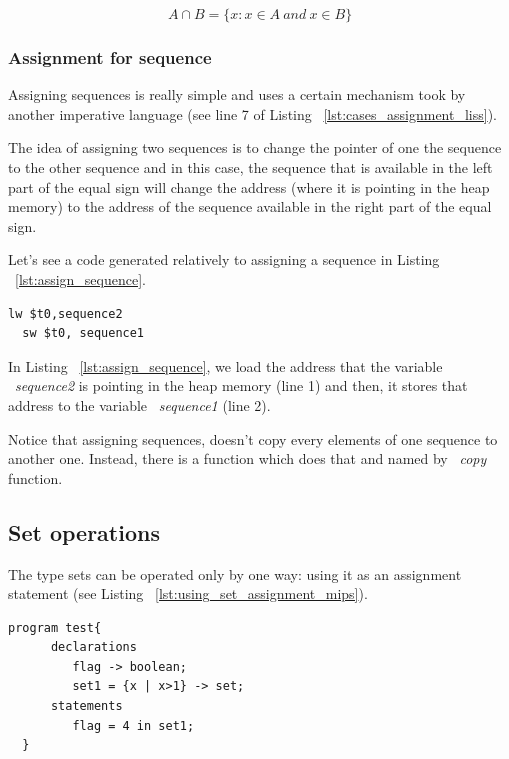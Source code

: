 \documentclass[
  oneside,
  11pt, a4paper,
  footinclude=true,
  headinclude=true,
  cleardoublepage=empty
]{scrbook}
\begin{document}
\begin{equation}
  A \cap B = \{ x : x \in A\ and\ x \in B\}
\end{equation}

\subsubsection{Assignment for sequence}

Assigning sequences is really simple and uses a certain mechanism took by another imperative language (see line 7 of Listing ~\ref{lst:cases_assignment_liss}).

The idea of assigning two sequences is to change the pointer of one the sequence to the other sequence and in this case, the sequence that is available in the left part of the equal sign will change the address (where it is pointing in the heap memory) to the address of the sequence available in the right part of the equal sign.

Let's see a code generated relatively to assigning a sequence in Listing ~\ref{lst:assign_sequence}.

\begin{lstlisting}[caption={Code generated for line 7 of Listing ~\ref{lst:cases_assignment_liss}},label={lst:assign_sequence}]
  lw $t0,sequence2		
  sw $t0, sequence1		
\end{lstlisting}

In Listing ~\ref{lst:assign_sequence}, we load the address that the variable ~\textit{sequence2} is pointing in the heap memory (line 1) and then, it stores that address to the variable ~\textit{sequence1} (line 2).

Notice that assigning sequences, doesn't copy every elements of one sequence to another one. Instead, there is a function which does that and named by ~\textit{copy} function.

\subsection{Set operations}

The type sets can be operated only by one way: using it as an assignment statement (see Listing ~\ref{lst:using_set_assignment_mips}).

\begin{lstlisting}[caption={Example of using a set in LISS},label={lst:using_set_assignment_mips}]
  program test{
      declarations
         flag -> boolean;
         set1 = {x | x>1} -> set;
      statements
         flag = 4 in set1;
  }
\end{lstlisting}
\end{document}

